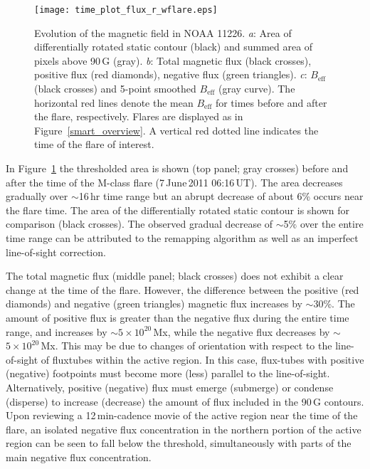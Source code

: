 
\begin{figure}[!t]
\centerline{\texttt{[image: time\_plot\_flux\_r\_wflare.eps]}}
\caption[Short-term evolution of NOAA 11226]{Evolution of the magnetic field in NOAA 11226. \emph{a}: Area of differentially rotated static contour (black) and summed area of pixels above 90\,G (gray). \emph{b}: Total magnetic flux (black crosses), positive flux (red diamonds), negative flux (green triangles). \emph{c}: $B_{\mathrm{eff}}$ (black crosses) and 5-point smoothed $B_{\mathrm{eff}}$ (gray curve). The horizontal red lines denote the mean $B_{\mathrm{eff}}$ for times before and after the flare, respectively. Flares are displayed as in Figure~\ref{smart_overview}. A vertical red dotted line indicates the time of the flare of interest.}
\label{smartprepostflare}
\end{figure}


In Figure~\ref{smartprepostflare} the thresholded area is shown (top panel; gray crosses) before and after the time of the M-class flare (7\,June\,2011 06:16\,UT). The area decreases gradually over $\sim$16\,hr time range but an abrupt decrease of about 6\% occurs near the flare time. The area of the differentially rotated static contour is shown for comparison (black crosses). The observed gradual decrease of $\sim$5\% over the entire time range can be attributed to the remapping algorithm as well as an imperfect line-of-sight correction.

The total magnetic flux (middle panel; black crosses) does not exhibit a clear change at the time of the flare. However, the difference between the positive (red diamonds) and negative (green triangles) magnetic flux increases by $\sim$30\%. The amount of positive flux is greater than the negative flux during the entire time range, and increases by $\sim$$5\times10^{20}$\,Mx, while the negative flux decreases by $\sim$$5\times10^{20}$\,Mx. This may be due to changes of orientation with respect to the line-of-sight of fluxtubes within the active region. In this case, flux-tubes with positive (negative) footpoints must become more (less) parallel to the line-of-sight. Alternatively, positive (negative) flux must emerge (submerge) or condense (disperse) to increase (decrease) the amount of flux included in the 90\,G contours. Upon reviewing a 12\,min-cadence movie of the active region near the time of the flare,
an isolated negative flux concentration in the northern portion of the active region can be seen to fall below the threshold, simultaneously with parts of the main negative flux concentration.


